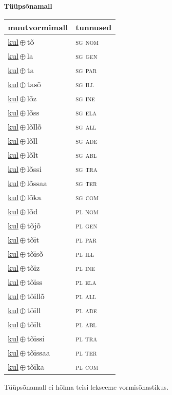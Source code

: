 

\vspace{3.5em}
\noindent \begin{minipage}{\textwidth}
\noindent \textbf{Tüüpsõnamall \,}\\

\begin{sideways}
\begin{tabular}{l l}
muutvormimall & tunnused \\
\hline
\underline{kul}\,$\oplus$\,tõ & \textsc{ sg nom } \\
\underline{kul}\,$\oplus$\,la & \textsc{ sg gen } \\
\underline{kul}\,$\oplus$\,ta & \textsc{ sg par } \\
\underline{kul}\,$\oplus$\,tasõ & \textsc{ sg ill } \\
\underline{kul}\,$\oplus$\,lõz & \textsc{ sg ine } \\
\underline{kul}\,$\oplus$\,lõss & \textsc{ sg ela } \\
\underline{kul}\,$\oplus$\,lõllõ & \textsc{ sg all } \\
\underline{kul}\,$\oplus$\,lõll & \textsc{ sg ade } \\
\underline{kul}\,$\oplus$\,lõlt & \textsc{ sg abl } \\
\underline{kul}\,$\oplus$\,lõssi & \textsc{ sg tra } \\
\underline{kul}\,$\oplus$\,lõssaa & \textsc{ sg ter } \\
\underline{kul}\,$\oplus$\,lõka & \textsc{ sg com } \\
\underline{kul}\,$\oplus$\,lõd & \textsc{ pl nom } \\
\underline{kul}\,$\oplus$\,tõjõ & \textsc{ pl gen } \\
\underline{kul}\,$\oplus$\,tõit & \textsc{ pl par } \\
\underline{kul}\,$\oplus$\,tõisõ & \textsc{ pl ill } \\
\underline{kul}\,$\oplus$\,tõiz & \textsc{ pl ine } \\
\underline{kul}\,$\oplus$\,tõiss & \textsc{ pl ela } \\
\underline{kul}\,$\oplus$\,tõillõ & \textsc{ pl all } \\
\underline{kul}\,$\oplus$\,tõill & \textsc{ pl ade } \\
\underline{kul}\,$\oplus$\,tõilt & \textsc{ pl abl } \\
\underline{kul}\,$\oplus$\,tõissi & \textsc{ pl tra } \\
\underline{kul}\,$\oplus$\,tõissaa & \textsc{ pl ter } \\
\underline{kul}\,$\oplus$\,tõika & \textsc{ pl com } \\
\end{tabular}
\end{sideways}
\label{tab:tüüpsõnamall-kultõ}

\end{minipage}

 
\vspace{1em}
\noindent Tüüpsõnamall  ei hõlma teisi lekseeme vormi\-sõnastikus.
